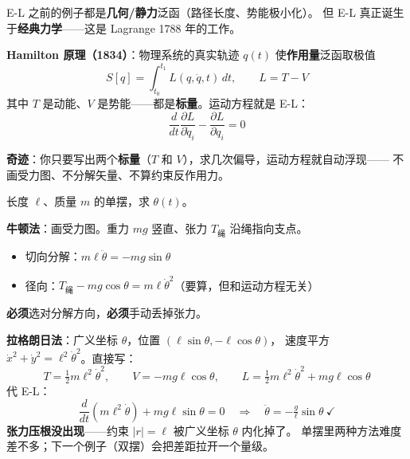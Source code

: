 \documentclass[12pt, a4paper]{ctexart}
\begin{document}

\begin{blackboard}

E-L 之前的例子都是\textbf{几何/静力}泛函（路径长度、势能极小化）。
但 E-L 真正诞生于\textbf{经典力学}——这是 Lagrange 1788 年的工作。

\textbf{Hamilton 原理（1834）}：物理系统的真实轨迹 $q(t)$ 使\textbf{作用量}泛函取极值
\[
S[q] = \int_{t_0}^{t_1} L(q, \dot q, t)\, dt, \qquad L = T - V
\]
其中 $T$ 是动能、$V$ 是势能——都是\textbf{标量}。运动方程就是 E-L：
\[
\frac{d}{dt}\frac{\partial L}{\partial \dot q_i} - \frac{\partial L}{\partial q_i} = 0
\]

\textbf{奇迹}：你只要写出两个\textbf{标量}（$T$ 和 $V$），求几次偏导，运动方程就自动浮现——
不画受力图、不分解矢量、不算约束反作用力。

\end{blackboard}

\begin{blackboard}[例5：单摆——牛顿 vs 拉格朗日（热身）]

长度 $\ell$、质量 $m$ 的单摆，求 $\theta(t)$。

\textbf{牛顿法}：画受力图。重力 $mg$ 竖直、张力 $T_\text{绳}$ 沿绳指向支点。
\begin{itemize}
    \item 切向分解：$m\ell\ddot\theta = -mg\sin\theta$
    \item 径向：$T_\text{绳} - mg\cos\theta = m\ell\dot\theta^2$（要算，但和运动方程无关）
\end{itemize}
\textbf{必须}选对分解方向，\textbf{必须}手动丢掉张力。

\textbf{拉格朗日法}：广义坐标 $\theta$，位置 $(\ell\sin\theta, -\ell\cos\theta)$，
速度平方 $\dot x^2 + \dot y^2 = \ell^2\dot\theta^2$。直接写：
\[
T = \tfrac{1}{2}m\ell^2\dot\theta^2,\qquad
V = -mg\ell\cos\theta,\qquad
L = \tfrac{1}{2}m\ell^2\dot\theta^2 + mg\ell\cos\theta
\]
代 E-L：
\[
\frac{d}{dt}(m\ell^2\dot\theta) + mg\ell\sin\theta = 0
\quad\Rightarrow\quad
\ddot\theta = -\tfrac{g}{\ell}\sin\theta\ \checkmark
\]
\textbf{张力压根没出现}——约束 $|r|=\ell$ 被广义坐标 $\theta$ 内化掉了。
单摆里两种方法难度差不多；下一个例子（双摆）会把差距拉开一个量级。

\end{blackboard}
\end{document}
